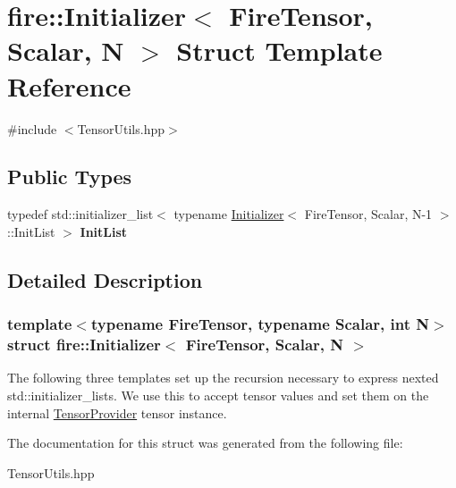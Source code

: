 \hypertarget{a00021}{}\section{fire\+:\+:Initializer$<$ Fire\+Tensor, Scalar, N $>$ Struct Template Reference}
\label{a00021}


{\ttfamily \#include $<$Tensor\+Utils.\+hpp$>$}

\subsection*{Public Types}
\begin{DoxyCompactItemize}
\item 
\hypertarget{a00021_aeb5626b5276d5c021ba8971b2d524c45}{}typedef std\+::initializer\+\_\+list$<$ typename \hyperlink{a00021}{Initializer}$<$ Fire\+Tensor, Scalar, N-\/1 $>$\+::Init\+List $>$ {\bfseries Init\+List}\label{a00021_aeb5626b5276d5c021ba8971b2d524c45}

\end{DoxyCompactItemize}


\subsection{Detailed Description}
\subsubsection*{template$<$typename Fire\+Tensor, typename Scalar, int N$>$struct fire\+::\+Initializer$<$ Fire\+Tensor, Scalar, N $>$}

The following three templates set up the recursion necessary to express nexted std\+::initializer\+\_\+lists. We use this to accept tensor values and set them on the internal \hyperlink{a00047}{Tensor\+Provider} tensor instance. 

The documentation for this struct was generated from the following file\+:\begin{DoxyCompactItemize}
\item 
Tensor\+Utils.\+hpp\end{DoxyCompactItemize}
